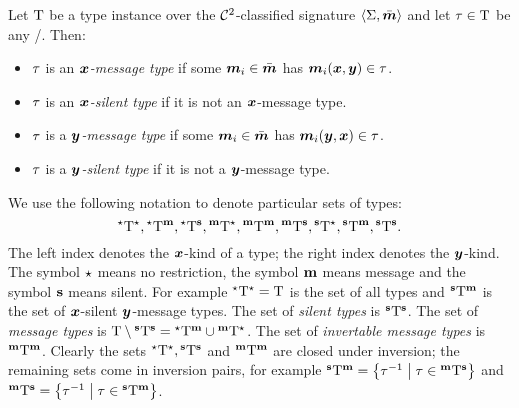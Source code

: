 \begin{definition}
Let $\TI$ be a type instance over the $\vFoc2$-classified signature
$\ClSig\SigS\sms$ and let $\tpt\in\TI$ be any \twotype/.
Then:
\begin{itemize}
  \item 
  $\tpt$ is an \emph{$\xx$-message type} if some $\smm\ii\in\sms$
  has $\smm\ii(\xx,\yy)\in\tpt$.
  \item
  $\tpt$ is an \emph{$\xx$-silent type} if it is not an $\xx$-message type.
  \item
  $\tpt$ is a \emph{$\yy$-message type} if some $\smm\ii\in\sms$
  has $\smm\ii(\yy,\xx)\in\tpt$.
  \item
  $\tpt$ is a \emph{$\yy$-silent type} if it is not a $\yy$-message type.
\end{itemize}
We use the following notation to denote particular sets of types:
\[
  \TIall.
\]
The left index denotes the $\xx$-kind of a type;
the right index denotes the $\yy$-kind.
The symbol $\arn$ means no restriction, the symbol $\arm$ means message and the
symbol $\ars$ means silent.
For example $\TIann = \TI$ is the set of all types and $\TIasm$ is the set of
$\xx$-silent $\yy$-message types.
The set of \emph{silent types} is $\TIass$.
The set of \emph{message types} is $\TI\sub\TIass = \TIanm\cup\TIamn$.
The set of \emph{invertable message types} is $\TIamm$.
Clearly the sets $\TIann, \TIass$ and $\TIamm$ are closed under inversion;
the remaining sets come in inversion pairs, for example
$\TIasm = \setbd{\inv\tpt}{\tpt\in\TIams}$ and 
$\TIams = \setbd{\inv\tpt}{\tpt\in\TIasm}$.
\end{definition}


